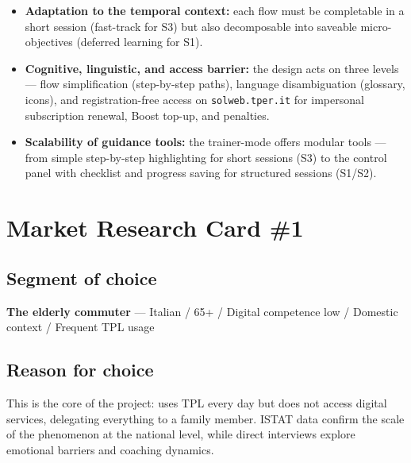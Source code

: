 ﻿\documentclass[11pt,a4paper]{article}
\begin{document}
\begin{itemize}[leftmargin=*,itemsep=6pt]

    \item \textbf{Adaptation to the temporal context:}
    each flow must be completable in a short session
    (fast-track for S3) but also decomposable into saveable
    micro-objectives (deferred learning for S1).

    \item \textbf{Cognitive, linguistic, and access barrier:}
    the design acts on three levels --- flow simplification
    (step-by-step paths), language disambiguation (glossary,
    icons), and registration-free access on \texttt{solweb.tper.it}
    for impersonal subscription renewal, Boost top-up, and penalties.

    \item \textbf{Scalability of guidance tools:}
    the trainer-mode offers modular tools --- from simple
    step-by-step highlighting for short sessions (S3) to the control
    panel with checklist and progress saving for structured
    sessions (S1/S2).

\end{itemize}

\newpage 

\section{Market Research Card \#1}

\subsection*{Segment of choice}
\begin{tcolorbox}[base]
\textbf{The elderly commuter} --- Italian / 65+ / Digital competence
low / Domestic context / Frequent TPL usage
\end{tcolorbox}

\subsection*{Reason for choice}
\begin{tcolorbox}[base]
This is the core of the project: uses TPL every day but does not access
digital services, delegating everything to a family member. ISTAT data confirm
the scale of the phenomenon at the national level, while direct
interviews explore emotional barriers and coaching dynamics.
\end{tcolorbox}
\end{document}
